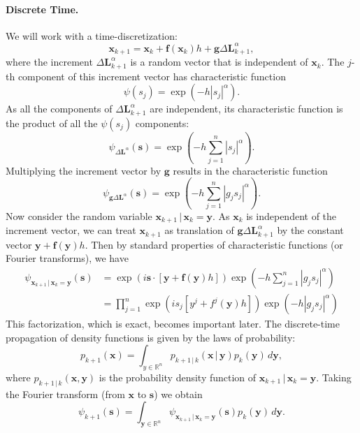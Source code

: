 \documentclass[12pt]{article}
\begin{document}
\paragraph{Discrete Time.} We will work with a time-discretization:
\[
\mathbf{x}_{k+1} = \mathbf{x}_k + \mathbf{f}(\mathbf{x}_k) h + \mathbf{g} \Delta \mathbf{L}^{\alpha}_{k+1},
\]
where the increment $\Delta \mathbf{L}_{k+1}^{\alpha}$ is a random vector that is independent of $\mathbf{x}_k$.  The $j$-th component of this increment vector has characteristic function
\[
\psi(s_j) = \exp(- h |s_j|^\alpha).
\]
As all the components of $\Delta \mathbf{L}_{k+1}^{\alpha}$ are independent, its characteristic function is the product of all the $\psi(s_j)$ components:
\[
\psi_{\Delta \mathbf{L}^\alpha}(\mathbf{s}) = \exp\left( -h \sum_{j=1}^n |s_j|^\alpha \right).
\]
Multiplying the increment vector by $\mathbf{g}$ results in the characteristic function
\[
\psi_{\mathbf{g} \Delta \mathbf{L}^\alpha}(\mathbf{s}) = \exp\left( -h \sum_{j=1}^n |g_j s_j|^\alpha \right).
\]
Now consider the random variable $\mathbf{x}_{k+1} \, | \, \mathbf{x}_k = \mathbf{y}$.  As $\mathbf{x}_k$ is independent of the increment vector, we can treat $\mathbf{x}_{k+1}$ as translation of $\mathbf{g} \Delta \mathbf{L}^\alpha_{k+1}$ by the constant vector $\mathbf{y} + \mathbf{f}(\mathbf{y}) h$.  Then by standard properties of characteristic functions (or Fourier transforms), we have
\begin{align}
\psi_{\mathbf{x}_{k+1} \, | \, \mathbf{x}_k = \mathbf{y}}(\mathbf{s}) &= \exp\left( i \mathbf{s} \cdot [\mathbf{y} + \mathbf{f}(\mathbf{y}) h] \right) \exp\left( -h \sum_{j=1}^n |g_j s_j|^\alpha \right) \nonumber \\
\label{eqn:prodcharfun}
 &= \prod_{j=1}^n \exp\left( i s_j [y^j + f^j(\mathbf{y}) h] \right) \exp\left( -h |g_j s_j|^\alpha \right)
\end{align}
This factorization, which is exact, becomes important later. 
The discrete-time propagation of density functions is given by the laws of probability:
\[
p_{k+1}(\mathbf{x}) = \int_{y \in \mathbb{R}^n} p_{k+1 \, | \, k}(\mathbf{x} \, | \,\mathbf{y}) p_k(\mathbf{y}) \, d \mathbf{y},
\]
where $p_{k+1 \, | \, k}(\mathbf{x},\mathbf{y})$ is the probability density function of $\mathbf{x}_{k+1} \, | \, \mathbf{x}_k = \mathbf{y}$.  Taking the Fourier transform (from $\mathbf{x}$ to $\mathbf{s}$) we obtain
\[
\psi_{k+1}(\mathbf{s}) = \int_{\mathbf{y} \in \mathbb{R}^n} \psi_{\mathbf{x}_{k+1} \, | \, \mathbf{x}_k = \mathbf{y}}(\mathbf{s}) p_k(\mathbf{y}) \, d \mathbf{y}.
\]
\end{document}
